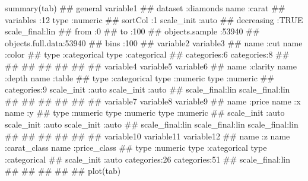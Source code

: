 {summary(tab)
##               general               variable1      
##  dataset          :diamonds   name       :carat    
##  variables        :12         type       :numeric  
##  sortCol          :1          scale_init :auto     
##  decreasing       :TRUE       scale_final:lin      
##  from             :0%
##  to               :100%
##  objects.sample   :53940                           
##  objects.full.data:53940                           
##  bins             :100                             
##       variable2                variable3          
##  name      :cut           name      :color        
##  type      :categorical   type      :categorical  
##  categories:6             categories:8            
##                                                   
##                                                   
##                                                   
##                                                   
##                                                   
##                                                   
##       variable4                 variable5             variable6      
##  name      :clarity       name       :depth     name       :table    
##  type      :categorical   type       :numeric   type       :numeric  
##  categories:9             scale_init :auto      scale_init :auto     
##                           scale_final:lin       scale_final:lin      
##                                                                      
##                                                                      
##                                                                      
##                                                                      
##                                                                      
##        variable7             variable8             variable9      
##  name       :price     name       :x         name       :y        
##  type       :numeric   type       :numeric   type       :numeric  
##  scale_init :auto      scale_init :auto      scale_init :auto     
##  scale_final:lin       scale_final:lin       scale_final:lin      
##                                                                   
##                                                                   
##                                                                   
##                                                                   
##                                                                   
##        variable10           variable11               variable12         
##  name       :z         name      :carat_class   name      :price_class  
##  type       :numeric   type      :categorical   type      :categorical  
##  scale_init :auto      categories:26            categories:51           
##  scale_final:lin                                                        
##                                                                         
##                                                                         
##                                                                         
##                                                                         
## 
plot(tab)



}
